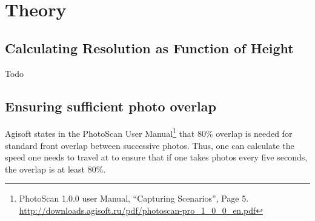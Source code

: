 \section{Theory}

\subsection{Calculating Resolution as Function of Height}

Todo

\subsection{Ensuring sufficient photo overlap}

Agisoft states in the PhotoScan User Manual\footnote{PhotoScan 1.0.0 user
Manual, ``Capturing Scenarios'', Page 5.
\url{http://downloads.agisoft.ru/pdf/photoscan-pro\_1\_0\_0\_en.pdf}} that 80\%
overlap is needed for standard front overlap between successive photos. Thus,
one can calculate the speed one needs to travel at to ensure that if one takes
photos every five seconds, the overlap is at least 80\%.

